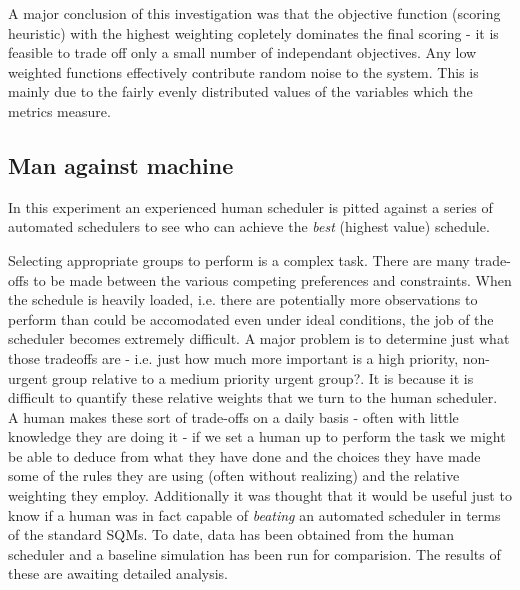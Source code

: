 \documentclass[12pt,a4paper]{article}
\begin{document}
{A major conclusion of this investigation was that the objective function (scoring heuristic) with the highest weighting copletely dominates the final scoring - it is feasible to trade off only a small number of independant objectives. Any low weighted functions effectively contribute random noise to the system. This is mainly due to the fairly evenly distributed values of the variables which the metrics measure.




\subsection{Man against machine}
\label{subsect:mam}
In this experiment an experienced human scheduler is pitted against a series of automated schedulers to see who can achieve the \emph{best} (highest value) schedule.

Selecting appropriate groups to perform is a complex task. There are many trade-offs to be made between the various competing preferences and constraints. When the schedule is heavily loaded, i.e. there are potentially more observations to perform than could be accomodated even under ideal conditions, the job of the scheduler becomes extremely difficult. A major problem is to determine just what those tradeoffs are - i.e. just how much more important is a high priority, non-urgent group relative to a medium priority urgent group?. It is because it is difficult to quantify these relative weights that we turn to the human scheduler. A human makes these sort of trade-offs on a daily basis - often with little knowledge they are doing it - if we set a human up to perform the task we might be able to deduce from what they have done and the choices they have made some of the rules they are using (often without realizing) and the relative weighting they employ. Additionally it was thought that it would be useful just to know if a human was in fact capable of \emph{beating} an automated scheduler in terms of the standard SQMs. To date, data has been obtained from the human scheduler and a baseline simulation has been run for comparision. The results of these are awaiting detailed analysis.

}
\end{document}
